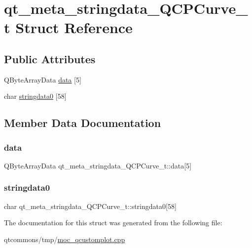 \hypertarget{structqt__meta__stringdata___q_c_p_curve__t}{}\section{qt\+\_\+meta\+\_\+stringdata\+\_\+\+Q\+C\+P\+Curve\+\_\+t Struct Reference}
\label{structqt__meta__stringdata___q_c_p_curve__t}
\subsection*{Public Attributes}
\begin{DoxyCompactItemize}
\item 
Q\+Byte\+Array\+Data \mbox{\hyperlink{structqt__meta__stringdata___q_c_p_curve__t_ae917b4062ebda7d9b411adcffe5f07b3}{data}} \mbox{[}5\mbox{]}
\item 
char \mbox{\hyperlink{structqt__meta__stringdata___q_c_p_curve__t_af0a799c56131086d126ad8f15f5f9bda}{stringdata0}} \mbox{[}58\mbox{]}
\end{DoxyCompactItemize}


\subsection{Member Data Documentation}
\mbox{\label{structqt__meta__stringdata___q_c_p_curve__t_ae917b4062ebda7d9b411adcffe5f07b3}} 
\subsubsection{\texorpdfstring{data}{data}}
{\footnotesize\ttfamily Q\+Byte\+Array\+Data qt\+\_\+meta\+\_\+stringdata\+\_\+\+Q\+C\+P\+Curve\+\_\+t\+::data\mbox{[}5\mbox{]}}

\mbox{\label{structqt__meta__stringdata___q_c_p_curve__t_af0a799c56131086d126ad8f15f5f9bda}} 
\subsubsection{\texorpdfstring{stringdata0}{stringdata0}}
{\footnotesize\ttfamily char qt\+\_\+meta\+\_\+stringdata\+\_\+\+Q\+C\+P\+Curve\+\_\+t\+::stringdata0\mbox{[}58\mbox{]}}



The documentation for this struct was generated from the following file\+:\begin{DoxyCompactItemize}
\item 
qtcommons/tmp/\mbox{\hyperlink{moc__qcustomplot_8cpp}{moc\+\_\+qcustomplot.\+cpp}}\end{DoxyCompactItemize}
